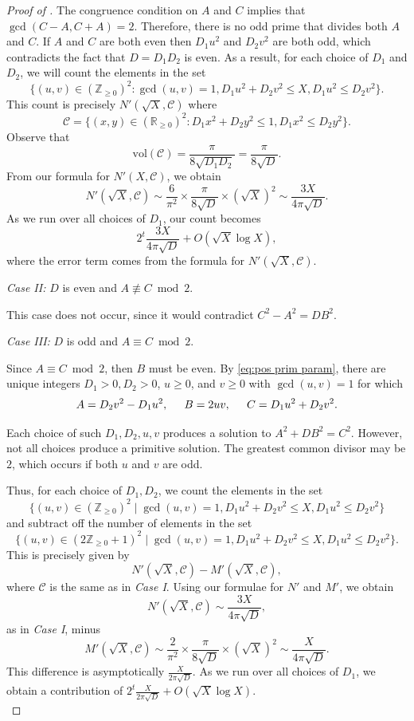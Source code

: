 \documentclass[12pt]{amsart}
\theoremstyle{plain}
\begin{document}
\begin{proof}[Proof of ]
The congruence condition on $A$ and $C$ implies that $\gcd(C-A, C+A) = 2$. Therefore, there is no odd prime that divides both $A$ and $C$. If $A$ and $C$ are both even then $D_1 u^2$ and $D_2 v^2$ are both odd, which contradicts the fact that $D = D_1 D_2$ is even. As a result, for each choice of $D_1$ and $D_2$, we will count the elements in the set 
\[ \{(u, v) \in (\mathbb{Z}_{\geq 0})^2 : \gcd(u, v) = 1, D_1u^2 + D_2v^2 \leq X, D_1u^2 \leq D_2 v^2\}.\]
This count is precisely $N'(\sqrt{X}, \mathcal{C})$ where 
\[ \mathcal{C} = \{(x,y) \in (\mathbb{R}_{\geq 0})^2 : D_1x^2 + D_2y^2 \leq 1, D_1x^2 \leq D_2 y^2\}. \]
Observe that 
\[ \mathrm{vol}(\mathcal{C}) = \frac{\pi}{8 \sqrt{D_1 D_2}} = \frac{\pi}{8 \sqrt{D}}. \]
From our formula for $N'(X, \mathcal{C})$, we obtain 
\[ N'(\sqrt{X}, \mathcal{C}) \sim \frac{6}{\pi^2} \times \frac{\pi}{8\sqrt{D}} \times (\sqrt{X})^2 \sim \frac{3X}{4 \pi \sqrt{D}}. \]
As we run over all choices of $D_1$, our count becomes 
\[ 2^t \frac{3X}{4 \pi\sqrt{D}} + O(\sqrt{X} \log X), \]
where the error term comes from the formula for $N'(\sqrt{X}, \mathcal{C})$.

\vspace{10pt}
\noindent \emph{Case II:} $D$ is even and $A\not\equiv C\bmod2$. 

This case does not occur, since it would contradict $C^2-A^2=D B^2$.

\vspace{10pt}
\noindent \emph{Case III:} $D$ is odd and $A\equiv C\bmod2$.

Since $A \equiv C\bmod2$, then $B$ must be even. By \eqref{eq:pos prim param}, there are unique integers $D_1 > 0, D_2 >0$, $u \geq 0$, and $v \geq 0$ with $\gcd(u, v) = 1$ for which 
\[ A = D_2 v^2 - D_1 u^2, \hspace{0.2 in} B = 2uv, \hspace{0.2 in} C = D_1u^2 + D_2v^2.\]

Each choice of such $D_1, D_2, u, v$ produces a solution to $A^2+DB^2=C^2$. However, not all choices produce a primitive solution. The greatest common divisor may be $2$, which occurs if both $u$ and $v$ are odd. 

Thus, for each choice of $D_1, D_2$, we count the elements in the set 
\[ \{(u,v) \in (\mathbb{Z}_{\geq 0})^2 \mid \gcd(u, v) = 1, D_1u^2 + D_2v^2 \leq X, D_1u^2 \leq D_2v^2\} \]
and subtract off the number of elements in the set 
\[ \{(u,v) \in (2\mathbb{Z}_{\geq 0} + 1)^2 \mid \gcd(u, v) = 1, D_1u^2 + D_2v^2 \leq X, D_1u^2 \leq D_2v^2\}.\]
This is precisely given by 
\[ N'(\sqrt{X}, \mathcal{C}) - M'(\sqrt{X}, \mathcal{C}),\]
where $\mathcal{C}$ is the same as in \textit{Case I}. Using our formulae for $N'$ and $M'$, we obtain 
\[ N'(\sqrt{X}, \mathcal{C}) \sim \frac{3X}{4 \pi \sqrt{D}},\]
as in \textit{Case I}, minus 
\[ M'(\sqrt{X}, \mathcal{C}) \sim \frac{2}{\pi^2} \times \frac{\pi}{8 \sqrt{D}} \times (\sqrt{X})^2 \sim \frac{X}{4 \pi\sqrt{D}}. \]
This difference is asymptotically $\frac{X}{2 \pi \sqrt{D}}$. As we run over all choices of $D_1$, we obtain a contribution of $2^t \frac{X}{2\pi \sqrt{D}} + O(\sqrt{X} \log X).$\\


\end{proof}
\end{document}
